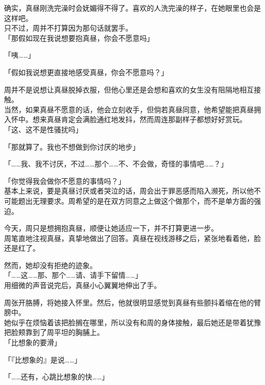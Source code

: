 确实，真昼刚洗完澡时会妩媚得不得了。喜欢的人洗完澡的样子，在她眼里也会是这样吧。\\

只不过，周并不打算因为那句话就罢手。\\

「那假如现在我说想要抱真昼，你会不愿意吗」

「咦……」

「假如我说想更直接地感受真昼，你会不愿意吗？」

周并不是说想让真昼脱掉衣服，但他心里还是会想和喜欢的女生没有阻隔地相互接触。\\

当然，如果真昼不愿意的话，他会立刻收手，但倘若真昼同意，他希望能把真昼拥入怀中。想来真昼肯定会满脸通红地发抖，然而周连那副样子都想好好赏玩。\\

「这、这不是性骚扰吗」

「那就算了。我也不想做到你讨厌的地步」

「……我、我不讨厌，不过……那个……不、不会做，奇怪的事情吧……？」

「你觉得我会做你不愿意的事情吗？」\\

基本上来说，要是真昼讨厌或者哭泣的话，周会出于罪恶感而陷入濒死，所以他不可能题出无理要求。周希望的是在双方同意之上做这个做那个，而不是单方面的强迫。

今天，周只是想拥抱真昼，顺便让她适应一下，并不打算更进一步。\\

周笔直地注视真昼，真挚地做出了回答。真昼在视线游移之后，紧张地看着他，脸还是红了。

然而，她却没有拒绝的迹象。\\

「……这……那、那个……请、请手下留情……」\\

用细微的声音说完后，真昼小心翼翼地伸出了手。

周张开胳膊，将她接入怀里。然后，他就很明显感觉到真昼有些颤抖着缩在他的臂膀中。\\

她似乎在烦恼着该把脸搁在哪里，所以没有和周的身体接触，最后她还是带着犹豫把脸颊靠到了周平坦的胸脯上。\\

「比想象的要滑」

「『比想象的』是说……」

「……还有，心跳比想象的快……」\\

